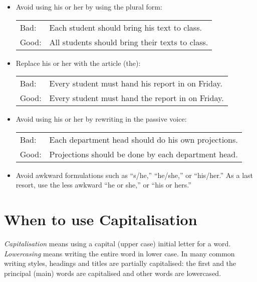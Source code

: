 \begin{itemize}
\item Avoid using his or her by using the plural form:

\begin{tabular}{lp{0.9\hsize}}
Bad:  & Each student should bring his text to class. \\
Good: & All students should bring their texts to class. \\
\end{tabular}


\item Replace his or her with the article (the):

\begin{tabular}{lp{0.9\hsize}}
Bad:  & Every student must hand his report in on Friday. \\
Good: & Every student must hand the report in on Friday. \\
\end{tabular}



\item Avoid using his or her by rewriting in the passive voice:

\begin{tabular}{lp{0.9\hsize}}
Bad:  & Each department head should do his own projections. \\
Good: & Projections should be done by each department head. \\
\end{tabular}


\item Avoid awkward formulations such as ``s/he,'' ``he/she,'' or
  ``his/her.'' As a last resort, use the less awkward ``he or she,''
  or ``his or hers.''

\end{itemize}







\section{When to use Capitalisation}

\emph{Capitalisation} means using a capital (upper case) initial
letter for a word. \emph{Lowercasing} means writing the entire word in
lower case. In many common writing styles, headings and titles are
partially capitalised: the first and the principal (main) words are
capitalised and other words are lowercased.

